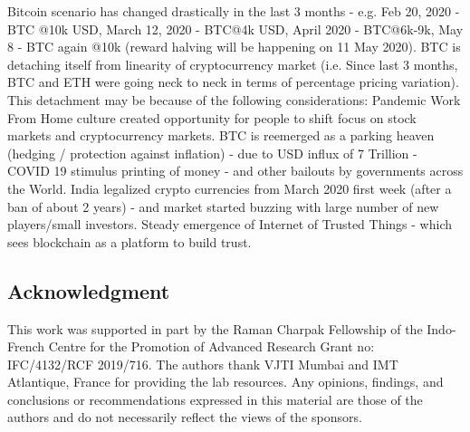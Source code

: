 \documentclass[preprint,12pt]{elsarticle}
\begin{document}
Bitcoin scenario has changed drastically in the last 3 months - e.g. Feb 20, 2020 - BTC @10k USD, March 12, 2020  - BTC@4k USD, April 2020 - BTC@6k-9k, May 8 - BTC again @10k (reward halving will be happening on 11 May 2020). BTC is detaching itself from linearity of cryptocurrency market (i.e. Since last 3 months, BTC and ETH were going neck to neck in terms of percentage pricing variation). This detachment may be because of the following considerations: Pandemic Work From Home culture created opportunity for people to shift focus on stock markets and cryptocurrency markets. BTC is reemerged as a parking heaven (hedging / protection against inflation) - due to USD influx of 7 Trillion - COVID 19 stimulus printing of money - and other bailouts by governments across the World. India legalized crypto currencies from March 2020 first week (after a ban of about 2 years) - and market started buzzing with large number of new players/small investors. Steady emergence of Internet of Trusted Things - which sees blockchain as a platform to build trust.

\subsection*{Acknowledgment}
This work was supported in part by the Raman Charpak Fellowship of the Indo-French Centre for the Promotion of Advanced Research Grant no: IFC/4132/RCF 2019/716. The authors thank VJTI Mumbai and IMT Atlantique, France for providing the lab resources. Any opinions, findings, and conclusions or recommendations expressed in this material are those of the authors and do not necessarily reflect the views of the sponsors.



\end{document}
